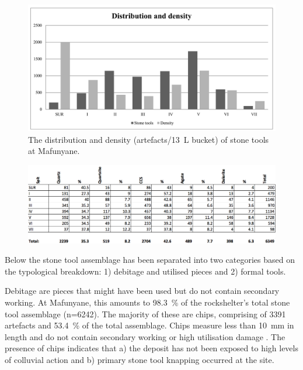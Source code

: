 	\begin{figure} %
		\includegraphics[width=\linewidth]{figures/Forssman-Figure04}
		\caption{The distribution and density (artefacts/\SI{13}{\liter} bucket) of stone tools at Mafunyane.}
		\label{fig:Forssman-Figure04}
	\end{figure}

	\begin{figure} %
		\includegraphics[width=\linewidth]{figures/Forssman-Table02}
		\label{fig:Forssman-Table02}
	\end{figure}

Below the stone tool assemblage has been separated into two categories based on the \textcite{Walker_1994} typological breakdown: 1) debitage and utilised pieces and 2) formal tools.

Debitage are  pieces that might have been used but do not contain secondary working. 
At Mafunyane, this amounts to \SI{98.3}{\percent} of the rockshelter’s total stone tool assemblage (n=\num{6242}). 
The majority of these are chips, comprising of \num{3391} artefacts and \SI{53.4}{\percent} of the total assemblage. 
Chips measure less than \SI{10}{\milli\meter}
  in length and do not contain secondary working or high utilisation damage \parencite[see][]{Deacon_1984a}. 
 The presence of chips indicates that a) the deposit has not been exposed to high levels of colluvial action \parencite{Kuman_2009} and b) primary stone tool knapping occurred at the site.

